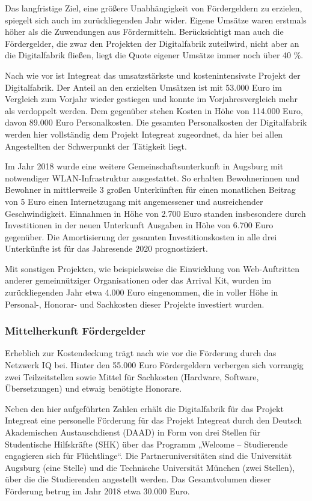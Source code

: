 \documentclass[12pt, a4paper]{article} %
\begin{document}
Das langfristige Ziel, eine größere Unabhängigkeit von Fördergeldern zu
erzielen, spiegelt sich auch im zurückliegenden Jahr wider. Eigene
Umsätze waren erstmals höher als die Zuwendungen aus Fördermitteln.
Berücksichtigt man auch die Fördergelder, die zwar den Projekten der
Digitalfabrik zuteilwird, nicht aber an die Digitalfabrik fließen, liegt
die Quote eigener Umsätze immer noch über 40 \%.

Nach wie vor ist Integreat das umsatzstärkste und kostenintensivste
Projekt der Digitalfabrik. Der Anteil an den erzielten Umsätzen ist mit
53.000 Euro im Vergleich zum Vorjahr wieder gestiegen und konnte im
Vorjahresvergleich mehr als verdoppelt werden. Dem gegenüber stehen
Kosten in Höhe von 114.000 Euro, davon 89.000 Euro Personalkosten. Die
gesamten Personalkosten der Digitalfabrik werden hier vollständig dem
Projekt Integreat zugeordnet, da hier bei allen Angestellten der
Schwerpunkt der Tätigkeit liegt.

Im Jahr 2018 wurde eine weitere Gemeinschaftsunterkunft in Augsburg mit
notwendiger WLAN-Infrastruktur ausgestattet. So erhalten Bewohnerinnen
und Bewohner in mittlerweile 3 großen Unterkünften für einen monatlichen
Beitrag von 5 Euro einen Internetzugang mit angemessener und
ausreichender Geschwindigkeit. Einnahmen in Höhe von 2.700 Euro standen
insbesondere durch Investitionen in der neuen Unterkunft Ausgaben in
Höhe von 6.700 Euro gegenüber. Die Amortisierung der gesamten
Investitionskosten in alle drei Unterkünfte ist für das Jahresende 2020
prognostiziert.

Mit sonstigen Projekten, wie beispielsweise die Einwicklung von
Web-Auftritten anderer gemeinnütziger Organisationen oder das Arrival
Kit, wurden im zurückliegenden Jahr etwa 4.000 Euro eingenommen, die in
voller Höhe in Personal-, Honorar- und Sachkosten dieser Projekte
investiert wurden.

\hypertarget{mittelherkunft-fuxf6rdergelder}{%
\subsubsection{Mittelherkunft
Fördergelder}\label{mittelherkunft-fuxf6rdergelder}}

Erheblich zur Kostendeckung trägt nach wie vor die Förderung durch das
Netzwerk IQ bei. Hinter den 55.000 Euro Fördergeldern verbergen sich
vorrangig zwei Teilzeitstellen sowie Mittel für Sachkosten (Hardware,
Software, Übersetzungen) und etwaig benötigte Honorare.

Neben den hier aufgeführten Zahlen erhält die Digitalfabrik für das
Projekt Integreat eine personelle Förderung für das Projekt Integreat
durch den Deutsch Akademischen Austauschdienst (DAAD) in Form von drei
Stellen für Studentische Hilfskräfte (SHK) über das Programm „Welcome –
Studierende engagieren sich für Flüchtlinge“. Die Partneruniversitäten
sind die Universität Augsburg (eine Stelle) und die Technische
Universität München (zwei Stellen), über die die Studierenden angestellt
werden. Das Gesamtvolumen dieser Förderung betrug im Jahr 2018 etwa
30.000 Euro.
\end{document}
